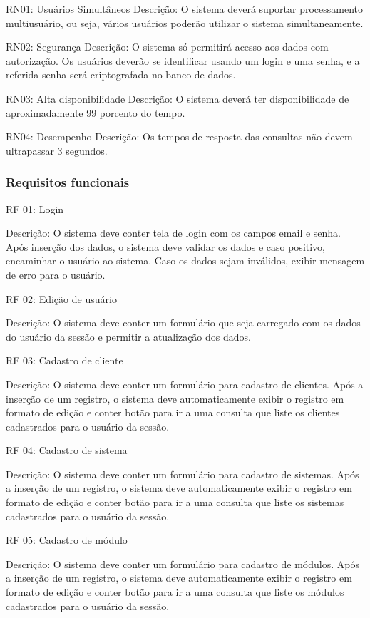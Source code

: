 RN01: Usuários Simultâneos
Descrição: O sistema deverá suportar processamento multiusuário, ou seja, vários usuários poderão utilizar o sistema simultaneamente. 


RN02: Segurança 
Descrição: O sistema só permitirá acesso aos dados com autorização. Os usuários deverão se identificar usando um login e uma senha, e a referida senha será criptografada no banco de dados.


RN03: Alta disponibilidade 
Descrição: O sistema deverá ter disponibilidade de aproximadamente 99 porcento do tempo. 


RN04: Desempenho 
Descrição: Os tempos de resposta das consultas não devem ultrapassar 3 segundos.


\subsubsection{Requisitos funcionais}


RF 01: Login


Descrição: O sistema deve conter tela de login com os campos email e senha. Após inserção dos dados, o sistema deve validar os dados e caso positivo, encaminhar o usuário ao sistema. Caso os dados sejam inválidos, exibir mensagem de erro para o usuário.


RF 02: Edição de usuário


Descrição: O sistema deve conter um formulário que seja carregado com os dados do usuário da sessão e permitir a atualização dos dados.

RF 03: Cadastro de cliente


Descrição: O sistema deve conter um formulário para cadastro de clientes. Após a inserção de um registro, o sistema deve automaticamente exibir o registro em formato de edição e conter botão para ir a uma consulta que liste os clientes cadastrados para o usuário da sessão.


RF 04: Cadastro de sistema


Descrição: O sistema deve conter um formulário para cadastro de sistemas. Após a inserção de um registro, o sistema deve automaticamente exibir o registro em formato de edição e conter botão para ir a uma consulta que liste os sistemas cadastrados para o usuário da sessão.


RF 05: Cadastro de módulo


Descrição: O sistema deve conter um formulário para cadastro de módulos. Após a inserção de um registro, o sistema deve automaticamente exibir o registro em formato de edição e conter botão para ir a uma consulta que liste os módulos cadastrados para o usuário da sessão.


